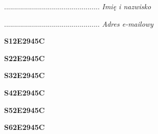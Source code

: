 \begin{turn}{90}\begin{minipage}{\linewidth} \vspace{20mm} ................................................  \textit{Imię i nazwisko}\end{minipage}\end{turn}

\begin{turn}{90}\begin{minipage}{\linewidth} \vspace{20mm} ................................................  \textit{Adres e-mailowy}\end{minipage}\end{turn}

\begin{turn}{90}\huge \begin{minipage}{\linewidth} \vspace{10mm}\textbf{S12E2945C}\end{minipage}\end{turn}

\begin{turn}{90}\huge \begin{minipage}{\linewidth} \vspace{10mm}\textbf{S22E2945C}\end{minipage}\end{turn}

\begin{turn}{90}\huge \begin{minipage}{\linewidth} \vspace{10mm}\textbf{S32E2945C}\end{minipage}\end{turn}

\begin{turn}{90}\huge \begin{minipage}{\linewidth} \vspace{10mm}\textbf{S42E2945C}\end{minipage}\end{turn}

\begin{turn}{90}\huge \begin{minipage}{\linewidth} \vspace{10mm}\textbf{S52E2945C}\end{minipage}\end{turn}

\begin{turn}{90}\huge \begin{minipage}{\linewidth} \vspace{10mm}\textbf{S62E2945C}\end{minipage}\end{turn}

